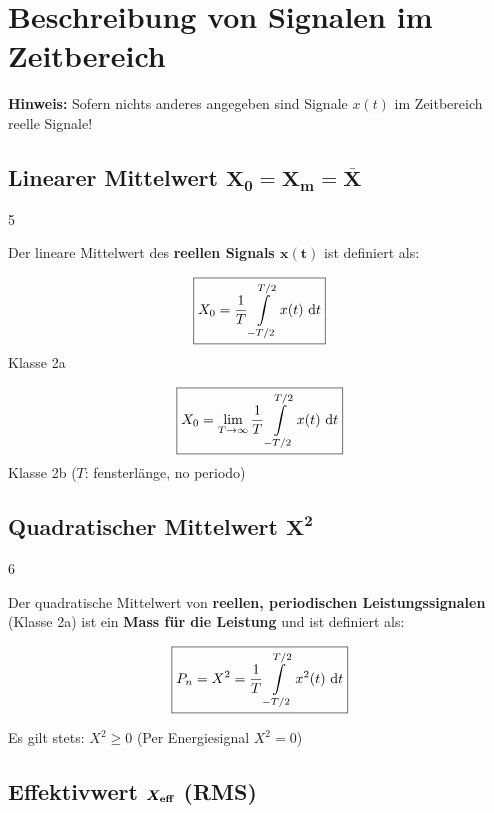 \section{Beschreibung von Signalen im Zeitbereich}

\textbf{Hinweis:} Sofern nichts anderes angegeben sind Signale $x(t)$ im Zeitbereich reelle Signale!


\subsection[Linearer Mittelwert]{Linearer Mittelwert $\bm{X_0 = X_m = \overline{X}}$}{5}

Der lineare Mittelwert des \textbf{reellen Signals $\bm{x(t)}$} ist definiert als:

\vspace{-0.2cm}

\begin{minipage}[t]{0.48\columnwidth}
    \begin{center}
        $$ \boxed{ X_0 = \frac{1}{T} \int\limits_{-T/2}^{T/2} x(t) \, \mathop{} \! \mathrm{d} t } $$
        Klasse 2a
    \end{center}
\end{minipage}
\hfill
\begin{minipage}[t]{0.48\columnwidth}
    \begin{center}
        $$ \boxed{ X_0 = \lim\limits_{T \to \infty} \frac{1}{T} \int\limits_{-T/2}^{T/2} x(t) \, \mathop{} \! \mathrm{d} t } $$
        Klasse 2b ($T$: fensterlänge, no periodo)
    \end{center}
\end{minipage}


\subsection[Quadratischer Mittelwert]{Quadratischer Mittelwert $\bm{X^2}$}{6}

Der quadratische Mittelwert von \textbf{\color{red}reellen, periodischen Leistungssignalen} (Klasse 2a) ist ein \textbf{Mass für die Leistung}
und ist definiert als:

$$ \boxed{P_n = X^2 = \frac{1}{T} \int\limits_{-T/2}^{T/2} x^2(t) \, \mathop{} \! \mathrm{d} t } $$

Es gilt stets: $X^2 \geq 0$ \qquad \qquad ({\small Per Energiesignal $X^2=0$})


\subsection[Effektivwert (RMS)]{Effektivwert $\bm{X_{\rm eff}}$ (RMS)}

